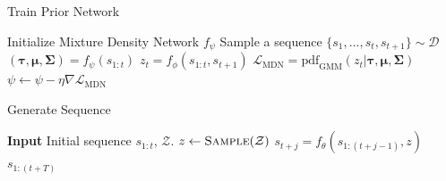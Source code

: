 \documentclass{article}
\begin{document}
\begin{minipage}[t]{7cm}
  \vspace{0pt}

  \begin{algorithm}[H]
    \caption{Train Prior Network}
    \begin{algorithmic}[1]
    \State Initialize Mixture Density Network $f_\psi$
    \State Sample a sequence $\{s_1, ..., s_t, s_{t+1}\} \sim \mathcal{D}$
    \State $(\bm{\tau}, \bm{\mu}, \bm{\Sigma}) = f_{\psi}(s_{1:t})$
    \State $z_t = f_{\phi}(s_{1:t}, s_{t+1})$
      \State $\mathcal{L}_\text{MDN} = \text{pdf}_\text{GMM}(z_t | \bm{\tau}, \bm{\mu}, \bm{\Sigma})$\footnotemark
    \State $\psi \gets \psi - \eta \nabla \mathcal{L}_\text{MDN}$
    \EndWhile
  \end{algorithmic}
  \end{algorithm}
\end{minipage}%
\begin{minipage}[t]{7cm}
  \vspace{0pt}

\begin{algorithm}[H]
  \caption{Generate Sequence}\label{algo-sample}
  \begin{algorithmic}[1]
    \State \textbf{Input} Initial sequence $s_{1:t}$, $\mathcal{Z}$.
    \State $z \gets \textsc{Sample}(\mathcal{Z})$
    \State $s_{t+j} = f_\theta(s_{1:(t+j-1)}, z)$
    \EndFor
    \Return $s_{1:(t+T)}$
    \State
    \State
    \State
    \State
  \end{algorithmic}
\end{algorithm}
\end{minipage}
\end{document}
